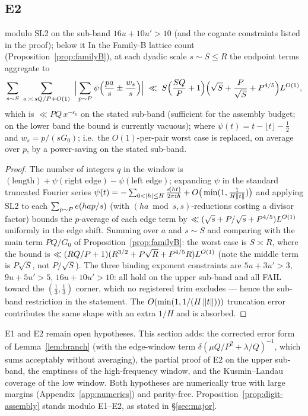 \subsection{E2}

\begin{proposition}\label{prop:E2}
\statusP{} modulo SL2 on the sub-band $16u+10u'>10$ (and the cognate
constraints listed in the proof); \statusO{} below it\quad
In the Family-B lattice count
(Proposition~\ref{prop:familyB}), at each dyadic scale $s\sim S\le R$
the endpoint terms aggregate to
\[
\sum_{s\sim S}\ \sum_{a\,\asymp\,sQ/P+O(1)}\ \Big|\sum_{p\sim P}
\psi\Big(\frac{pa}{s}\pm\frac{w_s}{s}\Big)\Big|
\;\ll\;S\Big(\frac{SQ}P+1\Big)
\Big(\sqrt S+\frac{P}{\sqrt S}+P^{4/5}\Big)L^{O(1)},
\]
which is $\ll PQ\,x^{-\varepsilon_0}$ on the stated sub-band (sufficient for the assembly budget; on the lower band the bound is currently vacuous);
where $\psi(t)=t-\lfloor t\rfloor-\tfrac12$ and $w_s=p/(sG_0)$; i.e.\
the $O(1)$-per-pair worst case is replaced, on average over $p$, by a
power-saving on the stated sub-band.
\end{proposition}

\begin{proof}
The number of integers $q$ in the window is
$(\text{length})+\psi(\text{right edge})-\psi(\text{left edge})$;
expanding $\psi$ in the standard truncated Fourier series
$\psi(t)=-\sum_{0<|h|\le H}\frac{\e{ht}}{2\pi ih}+O\big(\min(1,
\tfrac1{H\nm t})\big)$ and applying SL2 to each
$\sum_{p\sim P}e\!\left(hap/s\right)$ (with $(ha\bmod s,s)$-reductions costing a
divisor factor) bounds the $p$-average of each edge term by
$\ll(\sqrt s+P/\sqrt s+P^{4/5})L^{O(1)}$ uniformly in the edge
shift. Summing over $a$ and $s\sim S$ and comparing with the main term
$PQ/G_0$ of Proposition~\ref{prop:familyB}: the worst case is
$S\asymp R$, where the bound is
$\ll(RQ/P+1)(R^{3/2}+P\sqrt R+P^{4/5}R)L^{O(1)}$ (note the middle
term is $P\sqrt S$, not $P/\sqrt S$). The three binding exponent
constraints are $5u+3u'>3$, $9u+5u'>5$, $16u+10u'>10$: all hold on the
upper sub-band and all FAIL toward the $(\tfrac13,\tfrac13)$ corner,
which no registered trim excludes --- hence the sub-band restriction
in the statement. The $O(\min(1,1/(H\left\| t\right\|)))$ truncation error contributes
the same shape with an extra $1/H$ and is absorbed.
\end{proof}

\begin{remark}
E1 and E2 remain open hypotheses. This section adds: the corrected
error form of Lemma~\ref{lem:branch} (with the edge-window term
$\delta(\mu Q/P^{2}+\lambda/Q)^{-1}$, which sums acceptably without
averaging), the partial proof of E2 on the upper sub-band, the
emptiness of the high-frequency window, and the Kusmin--Landau
coverage of the low window. Both hypotheses are numerically true with
large margins (Appendix~\ref{app:numerics}) and parity-free.
Proposition~\ref{prop:digit-assembly} stands modulo E1--E2, as stated
in \S\ref{sec:major}.
\end{remark}
